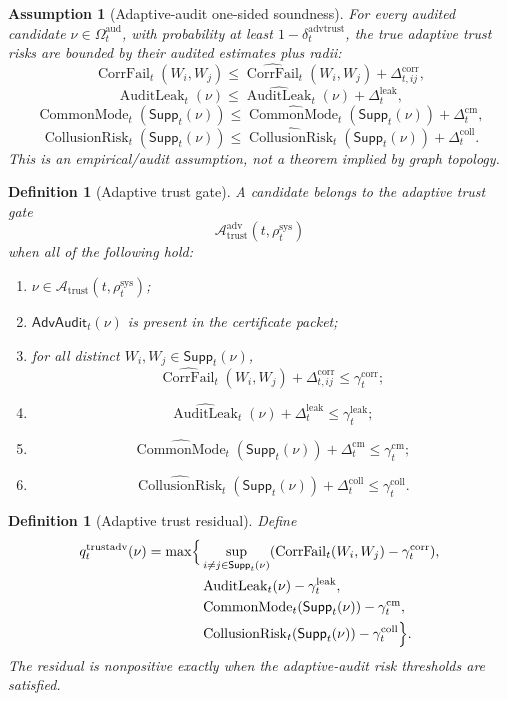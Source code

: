 \documentclass[11pt,a4paper]{article}
\newtheorem{definition}[theorem]{Definition}
\newtheorem{assumption}[theorem]{Assumption}
\newcommand{\Acal}{\mathcal A}
\newcommand{\adv}{\mathrm{adv}}
\newcommand{\sys}{\mathrm{sys}}
\newcommand{\aud}{\mathrm{aud}}
\newcommand{\trust}{\mathrm{trust}}
\newcommand{\trustadv}{\mathrm{trustadv}}
\newcommand{\advtrust}{\mathrm{advtrust}}
\newcommand{\CorrFail}{\operatorname{CorrFail}}
\newcommand{\AuditLeak}{\operatorname{AuditLeak}}
\newcommand{\CommonMode}{\operatorname{CommonMode}}
\newcommand{\CollusionRisk}{\operatorname{CollusionRisk}}
\begin{document}
\begin{assumption}[Adaptive-audit one-sided soundness]
\label{ass:adaptive-audit-one-sided-soundness}
For every audited candidate \(\nu\in\Omega_t^{\aud}\), with probability at least \(1-\delta_t^{\advtrust}\), the true adaptive trust risks are bounded by their audited estimates plus radii:
\[
\CorrFail_t(W_i,W_j)
\le
\widehat{\CorrFail}_t(W_i,W_j)+\Delta_{t,ij}^{\mathrm{corr}},
\]
\[
\AuditLeak_t(\nu)
\le
\widehat{\AuditLeak}_t(\nu)+\Delta_t^{\mathrm{leak}},
\]
\[
\CommonMode_t(\mathsf{Supp}_t(\nu))
\le
\widehat{\CommonMode}_t(\mathsf{Supp}_t(\nu))+\Delta_t^{\mathrm{cm}},
\]
\[
\CollusionRisk_t(\mathsf{Supp}_t(\nu))
\le
\widehat{\CollusionRisk}_t(\mathsf{Supp}_t(\nu))+\Delta_t^{\mathrm{coll}}.
\]
This is an empirical/audit assumption, not a theorem implied by graph topology.
\end{assumption}

\begin{definition}[Adaptive trust gate]
\label{def:adaptive-trust-gate-rclm}
A candidate belongs to the adaptive trust gate
\[
\Acal_{\trust}^{\adv}(t,\rho_t^{\sys})
\]
when all of the following hold:
\begin{enumerate}[label=(\roman*),leftmargin=1.5em]
    \item \(\nu\in\Acal_{\trust}(t,\rho_t^{\sys})\);
    \item \(\mathsf{AdvAudit}_t(\nu)\) is present in the certificate packet;
    \item for all distinct \(W_i,W_j\in\mathsf{Supp}_t(\nu)\),
    \[
    \widehat{\CorrFail}_t(W_i,W_j)+\Delta_{t,ij}^{\mathrm{corr}}\le\gamma_t^{\mathrm{corr}};
    \]
    \item
    \[
    \widehat{\AuditLeak}_t(\nu)+\Delta_t^{\mathrm{leak}}\le\gamma_t^{\mathrm{leak}};
    \]
    \item
    \[
    \widehat{\CommonMode}_t(\mathsf{Supp}_t(\nu))+\Delta_t^{\mathrm{cm}}\le\gamma_t^{\mathrm{cm}};
    \]
    \item
    \[
    \widehat{\CollusionRisk}_t(\mathsf{Supp}_t(\nu))+\Delta_t^{\mathrm{coll}}\le\gamma_t^{\mathrm{coll}}.
    \]
\end{enumerate}
\end{definition}

\begin{definition}[Adaptive trust residual]
\label{def:adaptive-trust-residual-rclm}
Define
\[
\begin{aligned}
q_t^{\trustadv}(\nu)=\max\Bigl\{&
\sup_{i\ne j\in\mathsf{Supp}_t(\nu)}
(\CorrFail_t(W_i,W_j)-\gamma_t^{\mathrm{corr}}),\\
&\AuditLeak_t(\nu)-\gamma_t^{\mathrm{leak}},\\
&\CommonMode_t(\mathsf{Supp}_t(\nu))-\gamma_t^{\mathrm{cm}},\\
&\CollusionRisk_t(\mathsf{Supp}_t(\nu))-\gamma_t^{\mathrm{coll}}
\Bigr\}.
\end{aligned}
\]
The residual is nonpositive exactly when the adaptive-audit risk thresholds are satisfied.
\end{definition}
\end{document}

